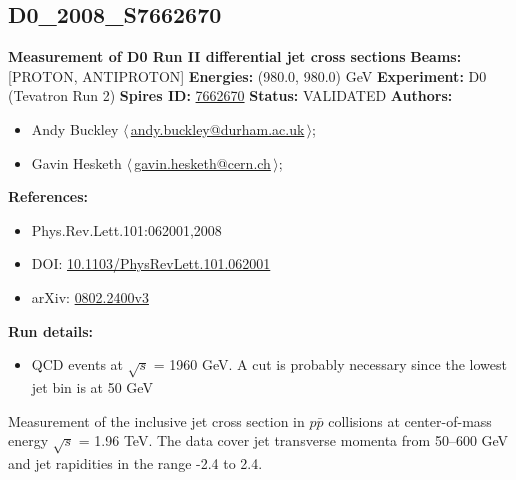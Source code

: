 \subsection[D0\_2008\_S7662670]{D0\_2008\_S7662670\,\cite{:2008hua}}
\textbf{Measurement of D0 Run II differential jet cross sections}\newline
\textbf{Beams:} [PROTON, ANTIPROTON] \newline
\textbf{Energies:} (980.0, 980.0) GeV \newline
\textbf{Experiment:} D0 (Tevatron Run 2) \newline
\textbf{Spires ID:} \href{http://www.slac.stanford.edu/spires/find/hep/www?rawcmd=key+7662670}{7662670}\newline
\textbf{Status:} VALIDATED\newline
\textbf{Authors:}
\begin{itemize}
  \item Andy Buckley $\langle\,$\href{mailto:andy.buckley@durham.ac.uk}{andy.buckley@durham.ac.uk}$\,\rangle$;
  \item Gavin Hesketh $\langle\,$\href{mailto:gavin.hesketh@cern.ch}{gavin.hesketh@cern.ch}$\,\rangle$;
\end{itemize}
\textbf{References:}
\begin{itemize}
  \item Phys.Rev.Lett.101:062001,2008
  \item DOI: \href{http://dx.doi.org/10.1103/PhysRevLett.101.062001}{10.1103/PhysRevLett.101.062001}
  \item arXiv: \href{http://arxiv.org/abs/0802.2400v3}{0802.2400v3}
\end{itemize}
\textbf{Run details:}
\begin{itemize}

  \item QCD events at \ensuremath{\sqrt{s}} = 1960 GeV. A \pTmin cut is probably necessary since the lowest jet \pT bin is at 50 GeV\end{itemize}

\noindent Measurement of the inclusive jet cross section in $p \bar{p}$ collisions at center-of-mass energy \ensuremath{\sqrt{s}} = 1.96 TeV. The data cover jet transverse momenta from 50--600 GeV and jet rapidities in the range -2.4 to 2.4.

\clearpage


\clearpage

